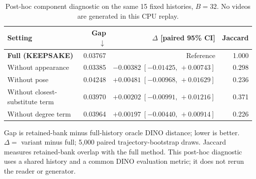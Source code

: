 \begin{table}[!ht]
\centering\small
\caption{Post-hoc component diagnostic on the same 15 fixed histories,
$B=32$. No videos are generated in this CPU replay.}
\label{tab:components-proxy-preview}
\setlength{\tabcolsep}{4pt}
\begin{tabular*}{\linewidth}{@{\extracolsep{\fill}}lrrr@{}}
\toprule
Setting & Gap $\downarrow$ & $\Delta$ [paired 95\% CI] & Jaccard \\
\midrule
\textbf{Full (KEEPSAKE)} & 0.03767 & Reference & 1.000 \\
Without appearance & 0.03385 & $-0.00382\;[-0.01425,\,+0.00743]$ & 0.298 \\
Without pose & 0.04248 & $+0.00481\;[-0.00968,\,+0.01629]$ & 0.236 \\
Without closest-substitute term & 0.03970 & $+0.00202\;[-0.00991,\,+0.01216]$ & 0.371 \\
Without degree term & 0.03964 & $+0.00197\;[-0.00440,\,+0.00914]$ & 0.226 \\
\bottomrule
\end{tabular*}
\par\smallskip
\begin{minipage}{\linewidth}\footnotesize
Gap is retained-bank minus full-history oracle DINO distance; lower is better.
$\Delta=$ variant minus full; 5,000 paired trajectory-bootstrap draws.
Jaccard measures retained-bank overlap with the full method. This post-hoc
diagnostic uses a shared history and a common DINO evaluation metric; it does
not rerun the reader or generator.
\end{minipage}
\end{table}
